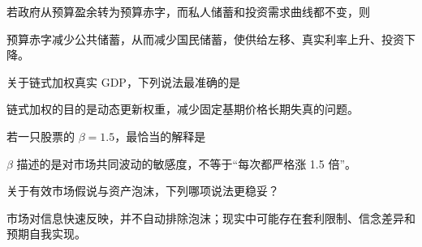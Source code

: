 \begin{question}
若政府从预算盈余转为预算赤字，而私人储蓄和投资需求曲线都不变，则
\begin{choiceoptions}[1]
\end{choiceoptions}
\begin{solution}
预算赤字减少公共储蓄，从而减少国民储蓄，使供给左移、真实利率上升、投资下降。
\end{solution}
\end{question}

\begin{question}
关于链式加权真实 GDP，下列说法最准确的是
\begin{choiceoptions}[1]
\end{choiceoptions}
\begin{solution}
链式加权的目的是动态更新权重，减少固定基期价格长期失真的问题。
\end{solution}
\end{question}

\begin{question}
若一只股票的 $\beta=1.5$，最恰当的解释是
\begin{choiceoptions}[2]
\end{choiceoptions}
\begin{solution}
$\beta$ 描述的是对市场共同波动的敏感度，不等于“每次都严格涨 1.5 倍”。
\end{solution}
\end{question}

\begin{question}
关于有效市场假说与资产泡沫，下列哪项说法更稳妥？
\begin{choiceoptions}[1]
\end{choiceoptions}
\begin{solution}
市场对信息快速反映，并不自动排除泡沫；现实中可能存在套利限制、信念差异和预期自我实现。
\end{solution}
\end{question}

